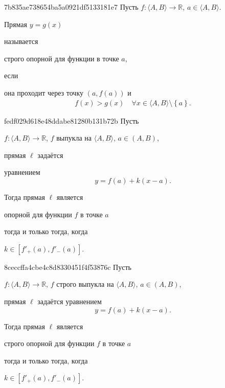 \begin{note}{7b835ae738654ba5a0921df5133181e7}
    Пусть \( f : \langle A, B \rangle \to \mathbb R  \), \( a \in \langle A, B \rangle  \).
    \begin{icloze}{2}Прямая \( y = g(x) \)\end{icloze} называется \begin{icloze}{1}строго опорной для функции в точке \( a \),\end{icloze} если
    \begin{icloze}{2}
        она проходит через точку \( (a, f(a)) \) и
        \[
            \begin{gathered}
                f(x) > g(x) \quad \forall x \in \langle A, B \rangle \setminus \left\{ a \right\}.
            \end{gathered}
        \]
    \end{icloze}
\end{note}

\begin{note}{fedf029d618e48ddabe81280b131b72b}
    Пусть \begin{icloze}{5}\( f : \langle A, B \rangle \to \mathbb R  \), \( f \) выпукла на \( \langle A, B \rangle  \), \( a \in (A, B) \),\end{icloze} прямая \( \ell \) задаётся
    \begin{icloze}{4}
        уравнением
        \[
            y = f(a) + k(x - a).
        \]
    \end{icloze}

    Тогда прямая \( \ell  \) является \begin{icloze}{1}опорной для функции \( f \)
    в точке \( a \)\end{icloze} \begin{icloze}{3}тогда и только тогда, когда\end{icloze}
    \begin{icloze}{2}
        \( k \in [f'_+ (a), f'_- (a) ] \).
    \end{icloze}
\end{note}

\begin{note}{8ceccffa4cbe4c8d8330451f4f53876c}
    Пусть \begin{icloze}{4}\( f : \langle A, B \rangle \to \mathbb R  \), \( f \) строго выпукла на \( \langle A, B \rangle  \), \( a \in (A, B) \),\end{icloze} прямая \( \ell \) задаётся уравнением
    \[
        y = f(a) + k(x - a).
    \]

    Тогда прямая \( \ell  \) является \begin{icloze}{1}строго опорной для функции \( f \) в точке \( a \)\end{icloze} \begin{icloze}{3}тогда и только тогда, когда\end{icloze} \begin{icloze}{2}\( k \in [f'_+ (a), f'_- (a) ] \).\end{icloze}
\end{note}

